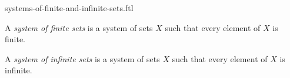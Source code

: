 \documentclass{stex}
\begin{document}
\begin{smodule}{systems-of-finite-and-infinite-sets.ftl}



\begin{definition*}[forthel,for=system of finite sets]
  A \emph{system of finite sets} is a system of sets $X$ such that every element of $X$ is finite.
\end{definition*}

\begin{definition*}[forthel,for=system of infinite sets]
  A \emph{system of infinite sets} is a system of sets $X$ such that every element of $X$ is infinite.
\end{definition*}

\end{smodule}
\end{document}
